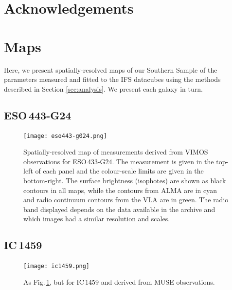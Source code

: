 \documentclass[a4paper,fleqn,usenatbib]{mnras}
\begin{document}
\section*{Acknowledgements}











\appendix
\section{Maps}
	\label{sec:Maps}

	Here, we present spatially-resolved maps of our Southern Sample of the parameters measured and fitted to the IFS datacubes using the methods described in Section \ref{sec:analysis}. We present each galaxy in turn.

	\subsection{ESO\,443-G24}
		\begin{figure}
			\centering
			\texttt{[image: eso443-g024.png]}
			\caption{Spatially-resolved map of measurements derived from VIMOS observations for ESO\,433-G24. The measurement is given in the top-left of each panel and the colour-scale limits are given in the bottom-right. The surface brightness (isophotes) are shown as black contours in all maps, while the  contours from ALMA are in cyan and radio continuum contours from the VLA are in green. The radio band displayed depends on the data available in the archive and which images had a similar resolution and scales.}
			\label{fig:eso443}
		\end{figure}

	\subsection{IC\,1459}
		\begin{figure}
			\centering
			\texttt{[image: ic1459.png]}
			\caption{As Fig.\,\ref{fig:eso443}, but for IC\,1459 and derived from MUSE observations.}
			\label{fig:ic1459}
		\end{figure}
\end{document}
